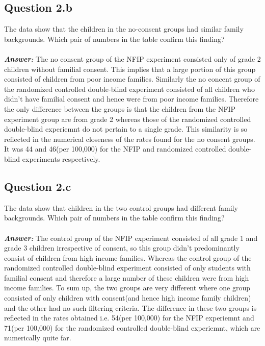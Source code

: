 \documentclass{article}
\begin{document}
\subsection{Question 2.b}
The data show that the children in the no-consent groups had similar family backgrounds. Which pair of numbers in the table confirm this finding?
\\
\\
\textit{\textbf{Answer: }} The no consent group of the NFIP experiment consisted only of grade 2 children without familial consent. This implies that a large portion of this group consisted of children from poor income families. Similarly the no concent group of the randomized controlled double-blind experiment consisted of all children who didn't have familial consent and hence were from poor income families. Therefore the only difference between the groups is that the children from the NFIP experiment group are from grade 2 whereas those of the randomized controlled double-blind experiemnt do not pertain to a single grade. This similarity is so reflected in the numerical closeness of the rates found for the no consent groups. It was 44 and 46(per 100,000) for the NFIP and randomized controlled double-blind experiments respectively.

\subsection{Question 2.c}
The data show that children in the two control groups had different family backgrounds. Which pair of numbers in the table confirm this finding?
\\
\\
\textit{\textbf{Answer: }} The control group of the NFIP experiment consisted of all grade 1 and grade 3 children irrespective of consent, so this group didn't predominantly consist of children from high income families. Whereas the control group of the randomized controlled double-blind experiment consisted of only students with familial consent and therefore a large number of these children were from high income families. To sum up, the two groups are very different where one group consisted of only children with consent(and hence high income family children) and the other had no such filtering criteria. The difference in these two groups is reflected in the rates obtained i.e. 54(per 100,000) for the NFIP experiemnt and 71(per 100,000) for the randomized controlled double-blind experiemnt, which are numerically quite far.
\end{document}
